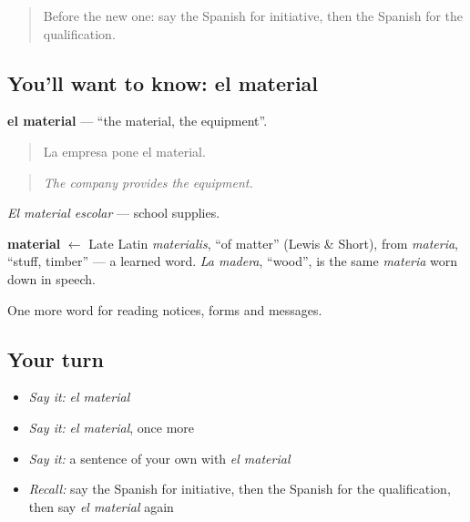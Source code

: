 \label{lesson:ES-C475-material}



\begin{quote}
Before the new one: say the Spanish for initiative, then the Spanish for the qualification.
\end{quote}

\subsection*{You'll want to know: el material}
\textbf{el material} — \textquotedblleft{}the material, the equipment\textquotedblright{}.

\begin{quote}
La empresa pone el material.
\end{quote}

\begin{quote}
\emph{The company provides the equipment.}
\end{quote}

\emph{El material escolar} — school supplies.

\begin{cousinweb}
\textbf{material} $\leftarrow$ Late Latin \emph{materialis}, \textquotedblleft{}of matter\textquotedblright{} (Lewis \& Short), from \emph{materia}, \textquotedblleft{}stuff, timber\textquotedblright{} — a learned word. \emph{La madera}, \textquotedblleft{}wood\textquotedblright{}, is the same \emph{materia} worn down in speech.
\end{cousinweb}

\begin{grammarlens}[title={What you've built}]
One more word for reading notices, forms and messages.
\end{grammarlens}

\subsection*{Your turn}
\begin{itemize}
\raggedright
  \item \emph{Say it:} \emph{el material}
  \item \emph{Say it:} \emph{el material}, once more
  \item \emph{Say it:} a sentence of your own with \emph{el material}
  \item \emph{Recall:} say the Spanish for initiative, then the Spanish for the qualification, then say \emph{el material} again
\end{itemize}

